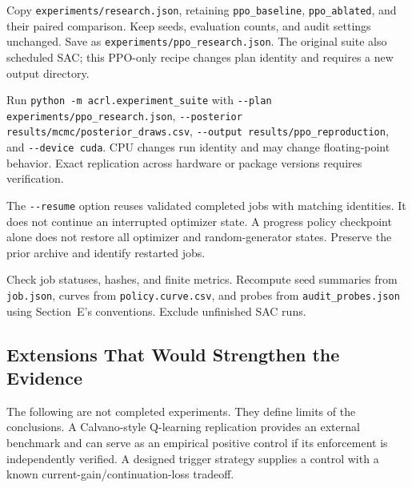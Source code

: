 \documentclass{article}
\begin{document}
Copy \texttt{experiments/research.json}, retaining \texttt{ppo\_baseline}, \texttt{ppo\_ablated}, and their paired comparison. Keep seeds, evaluation counts, and audit settings unchanged. Save as \texttt{experiments/ppo\_research.json}. The original suite also scheduled SAC; this PPO-only recipe changes plan identity and requires a new output directory.

Run \texttt{python -m acrl.experiment\_suite} with \texttt{-\/-plan experiments/ppo\_research.json}, \texttt{-\/-posterior results/mcmc/posterior\_draws.csv}, \texttt{-\/-output results/ppo\_reproduction}, and \texttt{-\/-device cuda}. CPU changes run identity and may change floating-point behavior. Exact replication across hardware or package versions requires verification.

The \texttt{-\/-resume} option reuses validated completed jobs with matching identities. It does not continue an interrupted optimizer state. A progress policy checkpoint alone does not restore all optimizer and random-generator states. Preserve the prior archive and identify restarted jobs.

Check job statuses, hashes, and finite metrics. Recompute seed summaries from \texttt{job.json}, curves from \texttt{policy.curve.csv}, and probes from \texttt{audit\_probes.json} using Section~E's conventions. Exclude unfinished SAC runs.

\subsection{Extensions That Would Strengthen the Evidence}

The following are not completed experiments. They define limits of the conclusions. A Calvano-style Q-learning replication provides an external benchmark and can serve as an empirical positive control if its enforcement is independently verified. A designed trigger strategy supplies a control with a known current-gain/continuation-loss tradeoff.
\end{document}
